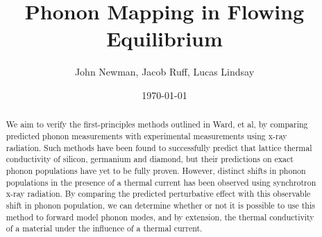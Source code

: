 \documentclass[aip,jap,12 pt,preprint]{revtex4-1}
\begin{document}

\title{Phonon Mapping in Flowing Equilibrium}%


\author{John Newman, Jacob Ruff, Lucas Lindsay}
%

\date{\today}%

\begin{abstract}
We aim to verify the first-principles methods outlined in Ward, et al, by comparing predicted phonon measurements with experimental measurements using x-ray radiation. Such methods have been found to successfully predict that lattice thermal conductivity of silicon, germanium and diamond, but their predictions on exact phonon populations have yet to be fully proven. However, distinct shifts in phonon populations in the presence of a thermal current has been observed using synchrotron x-ray radiation. By comparing the predicted perturbative effect with this observable shift in phonon population, we can determine whether or not it is possible to use this method to forward model phonon modes, and by extension, the thermal conductivity of a material under the influence of a thermal current.

\end{abstract}

\maketitle

\end{document}
